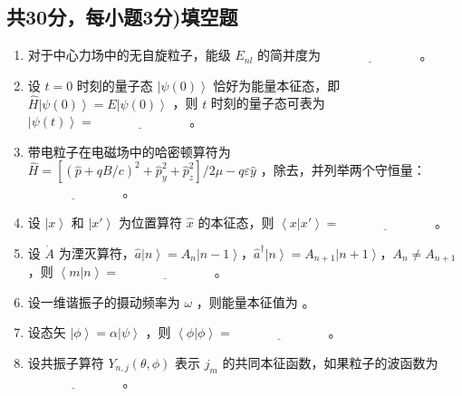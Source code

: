 \subsection{共30分，每小题3分)填空题}
\begin{enumerate}
    \item 对于中心力场中的无自旋粒子，能级 $E_{nl}$ 的简并度为 $\underline{\hspace{3cm}}$ 。
    \item 设 $t=0$ 时刻的量子态 $\left|\psi(0)\right\rangle$ 恰好为能量本征态，即 $\hat{H}\left|\psi(0)\right\rangle = E\left|\psi(0)\right\rangle$ ，则 $t$ 时刻的量子态可表为 $\left|\psi(t)\right\rangle = \underline{\hspace{3cm}}$ 。
    \item 带电粒子在电磁场中的哈密顿算符为 $\hat{H} = \left[(\hat{p} + qB/c)^2 + \hat{p}_y^2 + \hat{p}_z^2\right]/ 2\mu - q \varepsilon \hat{y}$ ，除去，并列举两个守恒量： $\underline{\hspace{3cm}}$ 。
    \item 设 $\left| x \right\rangle$ 和 $\left| x' \right\rangle$ 为位置算符 $\hat{x}$ 的本征态，则 $\left\langle x \left| x' \right\rangle\right. = \underline{\hspace{3cm}}$ 。
    \item 设 $\dot{A}$ 为湮灭算符，$\hat{a}\left| n \right\rangle = A_n\left| n-1 \right\rangle$，$\hat{a}^\dagger \left| n \right\rangle = A_{n+1}\left| n+1 \right\rangle$，$A_n \ne A_{n+1}$ ，则 $\left\langle m \left| n \right\rangle\right. = \underline{\hspace{3cm}}$ 。
    \item 设一维谐振子的摄动频率为 $\omega$ ，则能量本征值为 \underline{\hspace{3cm}} 。
    \item 设态矢 $\left|\phi\right\rangle = \alpha\left|\psi\right\rangle$ ，则 $\left\langle \phi\left| \phi \right\rangle\right. = \underline{\hspace{3cm}}$ 。
    \item 设共振子算符 $Y_{n,j}(\theta,\phi)$ 表示 $j_{m}$ 的共同本征函数，如果粒子的波函数为 $\underline{\hspace{3cm}}$ 。
\end{enumerate}
